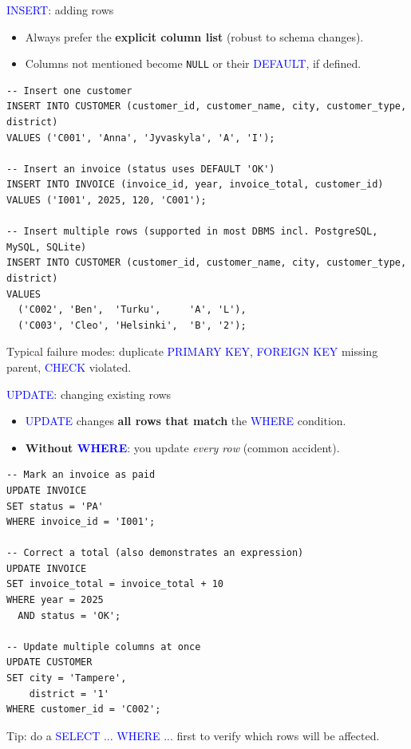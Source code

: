 \documentclass[10pt,aspectratio=169]{beamer}
\newcommand{\sqlk}[1]{\textcolor{blue}{#1}}
\begin{document}
\begin{frame}[fragile]{\sqlk{INSERT}: adding rows}
\small
\begin{itemize}
  \item Always prefer the \textbf{explicit column list} (robust to schema changes).
  \item Columns not mentioned become \texttt{NULL} or their \sqlk{DEFAULT}, if defined.
\end{itemize}
\vspace{1mm}

\begin{lstlisting}[style=sqlite,basicstyle=\scriptsize\ttfamily]
-- Insert one customer
INSERT INTO CUSTOMER (customer_id, customer_name, city, customer_type, district)
VALUES ('C001', 'Anna', 'Jyvaskyla', 'A', 'I');

-- Insert an invoice (status uses DEFAULT 'OK')
INSERT INTO INVOICE (invoice_id, year, invoice_total, customer_id)
VALUES ('I001', 2025, 120, 'C001');

-- Insert multiple rows (supported in most DBMS incl. PostgreSQL, MySQL, SQLite)
INSERT INTO CUSTOMER (customer_id, customer_name, city, customer_type, district)
VALUES
  ('C002', 'Ben',  'Turku',     'A', 'L'),
  ('C003', 'Cleo', 'Helsinki',  'B', '2');
\end{lstlisting}

\vspace{0.5em}
\footnotesize
Typical failure modes: duplicate \sqlk{PRIMARY KEY}, \sqlk{FOREIGN KEY} missing parent, \sqlk{CHECK} violated.
\end{frame}

\begin{frame}[fragile]{\sqlk{UPDATE}: changing existing rows}
\small
\begin{itemize}
  \item \sqlk{UPDATE} changes \textbf{all rows that match} the \sqlk{WHERE} condition.
  \item \textbf{Without \sqlk{WHERE}}: you update \emph{every row} (common accident).
\end{itemize}
\vspace{1mm}

\begin{lstlisting}[style=sqlite,basicstyle=\scriptsize\ttfamily]
-- Mark an invoice as paid
UPDATE INVOICE
SET status = 'PA'
WHERE invoice_id = 'I001';

-- Correct a total (also demonstrates an expression)
UPDATE INVOICE
SET invoice_total = invoice_total + 10
WHERE year = 2025
  AND status = 'OK';

-- Update multiple columns at once
UPDATE CUSTOMER
SET city = 'Tampere',
    district = '1'
WHERE customer_id = 'C002';
\end{lstlisting}

\vspace{0.5em}
\footnotesize Tip: do a \sqlk{SELECT ... WHERE ...} first to verify which rows will be affected.
\end{frame}
\end{document}
